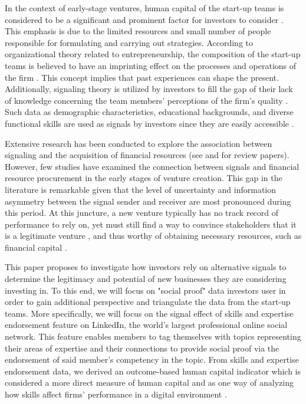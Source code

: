 \documentclass[12pt]{article}
\begin{document}
In the context of early-stage ventures, human capital of the start-up teams is considered to be a significant and prominent factor for investors to consider \citep{beckman2007early, ko2018signaling, matusik2008values}. This emphasis is due to the limited resources and small number of people responsible for formulating and carrying out strategies. According to organizational theory related to entrepreneurship, the composition of the start-up teams is believed to have an imprinting effect on the processes and operations of the firm \citep{packalen2007complementing}. This concept implies that past experiences can shape the present. Additionally, signaling theory is utilized by investors to fill the gap of their lack of knowledge concerning the team members' perceptions of the firm's quality \citep{plummer2016better}. Such data as demographic characteristics, educational backgrounds, and diverse functional skills are used as signals by investors since they are easily accessible \citep{colombo2005founders, beckman2007early, eddleston2016you}.

Extensive research has been conducted to explore the association between signaling and the acquisition of financial resources (see \citep{connelly2011signaling} and \citet{colombo2021use} for review papers). However, few studies have examined the connection between signals and financial resource procurement in the early stages of venture creation. This gap in the literature is remarkable given that the level of uncertainty \citep{matusik2008values} and information asymmetry between the signal sender and receiver \citep{spence2002signaling} are most pronounced during this period. At this juncture, a new venture typically has no track record of performance to rely on, yet must still find a way to convince stakeholders that it is a legitimate venture \citep{becker2015new}, and thus worthy of obtaining necessary resources, such as financial capital \citep{ko2018signaling}.

This paper proposes to investigate how investors rely on alternative signals to determine the legitimacy and potential of new businesses they are considering investing in. To this end, we will focus on "social proof" data investors user in order to gain additional perspective and triangulate the data from the start-up teams. More specifically, we will focus on the signal effect of skills and expertise endorsement feature on LinkedIn, the world's largest professional online social network. This feature enables members to tag themselves with topics representing their areas of expertise and their connections to provide social proof via the endorsement of said member's competency in the topic. From skills and expertise endorsement data, we derived an outcome-based human capital indicator which is considered a more direct measure of human capital and as one way of analyzing how skills affect firms' performance in a digital environment \citep{marvel2016human}.
\end{document}
